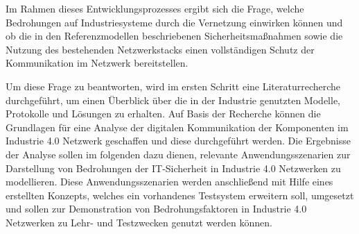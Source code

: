 Im Rahmen dieses Entwicklungsprozesses ergibt sich die Frage, welche Bedrohungen auf Industriesysteme durch die Vernetzung einwirken können und ob die in den Referenzmodellen beschriebenen Sicherheitsmaßnahmen sowie die Nutzung des bestehenden Netzwerkstacks einen vollständigen Schutz der Kommunikation im Netzwerk bereitstellen. 

Um diese Frage zu beantworten, wird im ersten Schritt eine Literaturrecherche durchgeführt, um einen Überblick über die in der Industrie genutzten Modelle, Protokolle und Lösungen zu erhalten. Auf Basis der Recherche können die Grundlagen für eine Analyse der digitalen Kommunikation der Komponenten im Industrie 4.0 Netzwerk geschaffen und diese durchgeführt werden. Die Ergebnisse der Analyse sollen im folgenden dazu dienen, relevante Anwendungsszenarien zur Darstellung von Bedrohungen der \ac{IT}-Sicherheit in Industrie 4.0 Netzwerken zu modellieren. Diese Anwendungsszenarien werden anschließend mit Hilfe eines erstellten Konzepts, welches ein vorhandenes Testsystem erweitern soll, umgesetzt und sollen zur Demonstration von Bedrohungsfaktoren in Industrie 4.0 Netzwerken zu Lehr- und Testzwecken genutzt werden können.